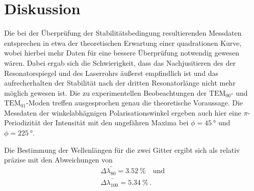 \section{Diskussion}
\label{sec:Diskussion}

Die bei der Überprüfung der Stabilitätsbedingung resultierenden Messdaten entsprechen in etwa der theoretischen Erwartung
einer quadrationen Kurve, wobei hierbei mehr Daten für eine bessere Überprüfung notwendig gewesen wären.
Dabei ergab sich die Schwierigkeit, 
dass das Nachjusitieren des der Resonatorspiegel und des Laserrohrs äußerst empfindlich ist
und das aufrecherhalten der Stabilität nach der dritten Resonatorlänge nicht mehr möglich gewesen ist.
Die zu experimentellen Beobeachtungen der $\text{TEM}_{00}$- und $\text{TEM}_{01}$-Moden treffen ausgesprochen genau die
theoretische Voraussage. 
Die Messdaten der winkelabhägnigen Polarisationswinkel ergeben auch hier eine $\pi$-Periodizität der Intensität
mit den ungefähren Maxima bei $\phi = \qty{45}{\degree}$ und $\phi = \qty{225}{\degree}$.

Die Bestimmung der Wellenlängen für die zwei Gitter ergibt sich als relativ präzise mit den Abweichungen von
\begin{align}
    \Delta \bar{\lambda_{80}} = \qty{3.52}{\percent} \quad \text{und} \\
    \Delta \bar{\lambda_{100}} = \qty{5.34}{\percent} \, .
\end{align}